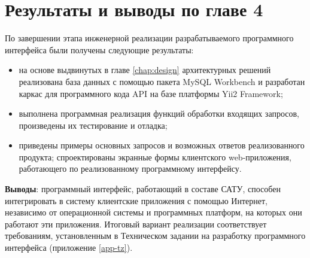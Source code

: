 	\pagebreak

\section{Результаты и выводы по главе 4}

\par

	По завершении этапа инженерной реализации разрабатываемого программного интерфейса были получены следующие результаты:

	\begin{itemize}
		\item на основе выдвинутых в главе \ref{chap:design} архитектурных решений реализована база данных с помощью пакета MySQL Workbench и разработан каркас для программного кода API на базе платформы Yii2 Framework;
		\item выполнена программная реализация функций обработки входящих запросов, произведены их тестирование и отладка;
		\item приведены примеры основных запросов и возможных ответов реализованного продукта;
спроектированы экранные формы клиентского web-приложения, работающего по реализованному программному интерфейсу.
	\end{itemize}
	
	\textbf{Выводы}: программный интерфейс, работающий в составе САТУ, способен интегрировать в систему клиентские приложения с помощью Интернет, независимо от операционной системы и программных платформ, на которых они работают эти приложения. Итоговый вариант реализации соответствует требованиям, установленным в Техническом задании на разработку программного интерфейса (приложение \ref{app-tz}).


